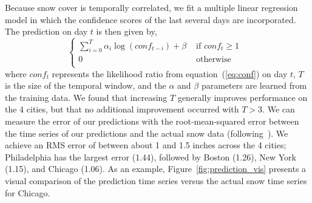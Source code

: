 %
%
%
%
Because snow cover is temporally correlated, we fit a multiple linear regression model in which 
the confidence scores of the last several days are incorporated. The prediction on day $t$ is then
given by,
%
\begin{equation*}
\begin{cases}
\sum_{i=0}^T \alpha_{i} \log(conf_{t-i})+\beta & \mbox{ if $conf_t \geq 1$ } \\
0 & \mbox { otherwise } \\
\end{cases}
\end{equation*}
%
where $conf_t$ represents the likelihood ratio from
equation~(\ref{eq:conf}) on day $t$, $T$ is the size of the temporal
window, and the $\alpha$ and $\beta$ parameters are learned from the
training data.  We found that increasing $T$
generally improves performance on the 4 cities, but that no additional
improvement occurred with $T > 3$. We can measure the error of our
predictions with the root-mean-squared error between the time
series of our predictions and the actual snow data
(following~\cite{jin10prediction}).
We achieve an RMS error of
between about 1 and 1.5 inches across the 4 cities; Philadelphia has
the largest error (1.44), followed by Boston (1.26), New York (1.15), and Chicago (1.06).
As an example, Figure~\ref{fig:prediction_vis} presents a visual comparison of the
prediction time series versus the actual snow time series for Chicago. 







